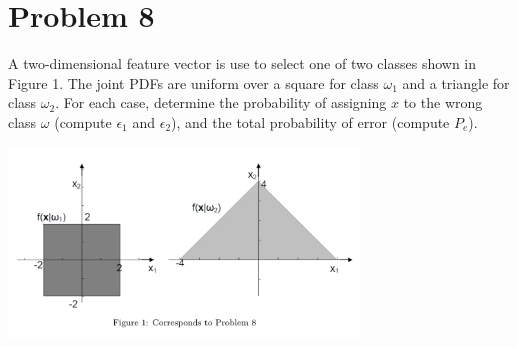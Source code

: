\documentclass[letterpaper,11pt]{article}
\begin{document}
\newpage

\section*{Problem 8}

A two-dimensional feature vector is use to select one of two classes shown in
Figure 1. The joint PDFs are uniform over a square for class $\omega_1$ and a triangle
for class $\omega_2$. For each case, determine the probability of assigning $x$ to the wrong
class $\omega$ (compute $\epsilon_1$ and $\epsilon_2$), and the total probability of error (compute $P_e$).

\begin{center}
\includegraphics[width=0.7\textwidth]{./img/P8.png}
\end{center}
\end{document}
